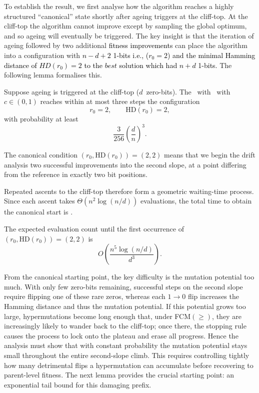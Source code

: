 To establish the result, we first analyse how the algorithm reaches a highly 
structured ``canonical'' state shortly after ageing triggers at the cliff-top.
At the cliff-top the algorithm cannot improve except by sampling the global 
optimum, and so ageing will eventually be triggered.  The key insight is that 
the iteration of ageing followed by two additional \textcolor{black}{fitness improvements} can place the 
algorithm into a configuration with \textcolor{black}{$n-d+2$ 1-bits i.e., ($r_0=2$) and the minimal Hamming distance of $HD(r_0)=2$ to the $best$ solution which had $n+d$ 1-bits.}  The following lemma formalises this.

\begin{lemma}%
	\label{lem:can-start-omega-d3}
	Suppose ageing is triggered at the cliff-top ($d$~zero-bits).  
	The \lastBest~with \linHD\ with $c\in(0,1)$ reaches within at most three steps the 
	configuration
	\[
	r_0=2, \qquad \mathrm{HD}(r_0)=2,
	\]
	with probability at least 
	\[
	\frac{3}{256}\left(\frac{d}{n}\right)^3.
	\]
\end{lemma}

The canonical condition $(r_0,\mathrm{HD}(r_0)) =
(2,2)$ means that we begin the drift analysis two successful improvements into
the second slope, at a point differing from the reference in exactly two
bit positions.

Repeated ascents to the cliff-top therefore form a geometric waiting-time 
process.  Since each ascent takes $\Theta(n^2\log(n/d))$ evaluations, the 
total time to obtain the canonical start is .

\begin{corollary}
	The expected evaluation count until the first occurrence of 
	$(r_0,\mathrm{HD}(r_0)) = (2,2)$ is 
	\[
	O\!\left(\frac{n^{5}\log(n/d)}{d^{3}}\right).
	\]
\end{corollary}


From the canonical starting point, the key difficulty is  the mutation
potential  too much.  With only few zero-bits remaining, successful
steps on the second slope require flipping one of these rare zeros, whereas each
$1\!\to0$ flip increases the Hamming distance and thus the mutation potential.
If this potential grows too large, hypermutations become long enough that, under
FCM$(\ge)$, they are increasingly likely to wander back to the cliff-top; once
there, the stopping rule causes the process to lock onto the plateau and erase
all progress.  Hence the analysis must show that with constant probability the
mutation potential stays small throughout the entire second-slope climb.  This
requires  controlling tightly how many detrimental flips a hypermutation can
accumulate before recovering to parent-level fitness.  The next lemma provides
the crucial starting point: an exponential tail bound for this damaging prefix.

